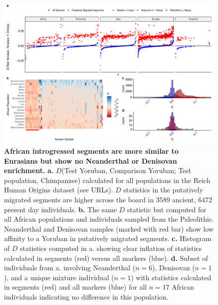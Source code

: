 \begin{figure}
	\centering
	\includegraphics[width=\textwidth]{plot/new_dstats.pdf}
	\caption{{\bf African introgressed segments are more similar to Eurasians but show no Neanderthal or Denisovan enrichment.} {\bf a.} $D$(Test Yoruban, Comparison Yoruban; Test population, Chimpanzee) calculated for all populations in the Reich Human Origins dataset (see URLs). $D$ statistics in the putatively migrated segments are higher across the board in 3589 ancient, 6472 present day individuals. {\bf b.} The same $D$ statistic but computed for all African populations and individuals sampled from the Paleolithic. Neanderthal and Denisovan samples (marked with red bar) show low affinity to a Yoruban in putatively migrated segments. {\bf c.} Histogram of $D$ statistics computed in a. showing clear inflation of statistics calculated in segments (red) versus all markers (blue). {\bf d.} Subset of individuals from a. involving Neanderthal ($n = 6$),  Denisovan ($n=1$), and a unique mixture individual ($n=1$) with statistics calculated in segments (red) and all markers (blue) for all $n=17$ African individuals indicating no difference in this population.} 
	\label{dstats}
\end{figure}



